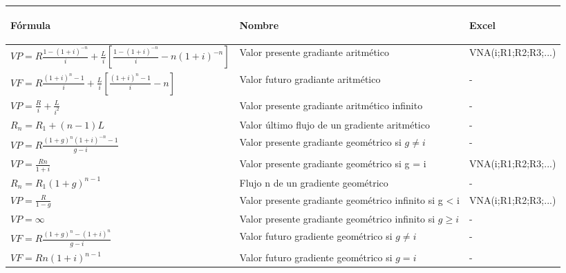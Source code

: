 \begin{center}
\begin{tabular}{ |p{6.8cm}|p{5cm}| p{3.2cm}|}
\hline 
\rowcolor{orange!50} 
\begin{center}\textbf{Fórmula}\end{center} & \begin{center}\textbf{Nombre}\end{center} & \begin{center}\textbf{Excel}\end{center}   \\ \hline                        


$VP = R  \frac{1-(1 + i)^{-n}}{i} + \frac{L}{i}[ \frac{1-(1 + i)^{-n}}{i} - n(1 + i)^{-n} ]$\hspace{35 pt} & Valor presente gradiante aritmético & VNA(i;R1;R2;R3;...)\\ \hline 


$VF = R\frac{(1+i)^n-1}{i} + \frac{L}{i}[\frac{(1+i)^n-1}{i}-n]$ \hspace{35 pt} & Valor futuro gradiante aritmético  
 & - \\  \hline 


$VP = \frac{R}{i} + \frac{L}{i^2}$ \hspace{35 pt} & Valor  presente gradiante aritmético infinito		
 & - \\ \hline 

$R_{n} = R_{1} + (n-1)L$ \hspace{35 pt} & Valor último flujo de un gradiente aritmético		
 & - \\ \hline  
 
 $VP = R  \frac{(1 + g)^n (1 + i)^{-n}-1}{g - i} $ \hspace{35 pt} & Valor presente gradiante geométrico si  $g \neq i$ &  
 - \\ \hline 

$VP = \frac{R n}{1 + i}$ \hspace{35 pt} & Valor presente gradiante geométrico si g = i	 &  VNA(i;R1;R2;R3;...)\\ \hline

$R_{n} = R_{1}(1+g)^{n-1}$ \hspace{35 pt} & Flujo n de un gradiente geométrico & - \\ \hline 

$VP = \frac{R}{1 - g} $ \hspace{35 pt} & Valor presente gradiante geométrico infinito si g < i 	
 &  VNA(i;R1;R2;R3;...) \\ \hline 

 $VP = \infty $ \hspace{35 pt} & Valor presente gradiante geométrico infinito si $g \geq i$ & - \\ \hline 


$VF = R  \frac{(1 + g)^n - (1 + i)^n}{g - i} $ & Valor futuro gradiente geométrico si $g \neq i$  & - \\ \hline 

$VF = Rn(1 + i)^{n-1} $ & Valor futuro gradiente geométrico si $g = i$  & - \\ \hline 

\end{tabular}
\end{center}


